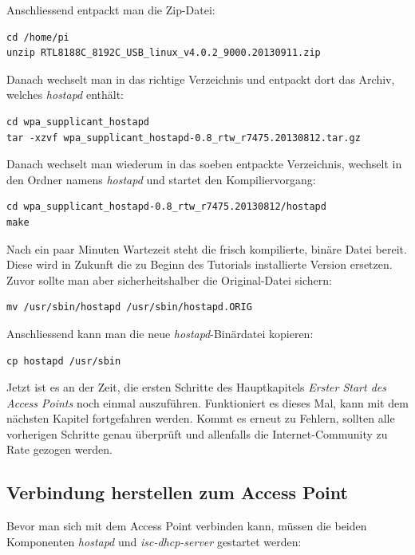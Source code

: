 Anschliessend entpackt man die Zip-Datei:

\begin{lstlisting}
cd /home/pi
unzip RTL8188C_8192C_USB_linux_v4.0.2_9000.20130911.zip
\end{lstlisting}

Danach wechselt man in das richtige Verzeichnis und entpackt dort das Archiv, welches \textit{hostapd} enthält:

\begin{lstlisting}
cd wpa_supplicant_hostapd
tar -xzvf wpa_supplicant_hostapd-0.8_rtw_r7475.20130812.tar.gz
\end{lstlisting}

Danach wechselt man wiederum in das soeben entpackte Verzeichnis, wechselt in den Ordner namens \textit{hostapd} und startet den Kompiliervorgang:

\begin{lstlisting}
cd wpa_supplicant_hostapd-0.8_rtw_r7475.20130812/hostapd
make
\end{lstlisting}

Nach ein paar Minuten Wartezeit steht die frisch kompilierte, binäre Datei bereit. Diese wird in Zukunft die zu Beginn des Tutorials installierte Version ersetzen. Zuvor sollte man aber sicherheitshalber die Original-Datei sichern:

\begin{lstlisting}
mv /usr/sbin/hostapd /usr/sbin/hostapd.ORIG
\end{lstlisting}

Anschliessend kann man die neue \textit{hostapd}-Binärdatei kopieren:

\begin{lstlisting}
cp hostapd /usr/sbin	
\end{lstlisting}

Jetzt ist es an der Zeit, die ersten Schritte des Hauptkapitels \textit{Erster Start des Access Points} noch einmal auszuführen. Funktioniert es dieses Mal, kann mit dem nächsten Kapitel fortgefahren werden. Kommt es erneut zu Fehlern, sollten alle vorherigen Schritte genau überprüft und allenfalls die Internet-Community zu Rate gezogen werden.

\subsection{Verbindung herstellen zum Access Point}
Bevor man sich mit dem Access Point verbinden kann, müssen die beiden Komponenten \textit{hostapd} und \textit{isc-dhcp-server} gestartet werden:

